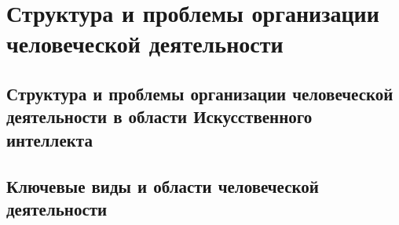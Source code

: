 \chapter{Структура и проблемы организации человеческой деятельности}
\label{chapter_automation_perspectives}


\section{Структура и проблемы организации человеческой деятельности в области Искусственного интеллекта}
\section{Ключевые виды и области человеческой деятельности}

%